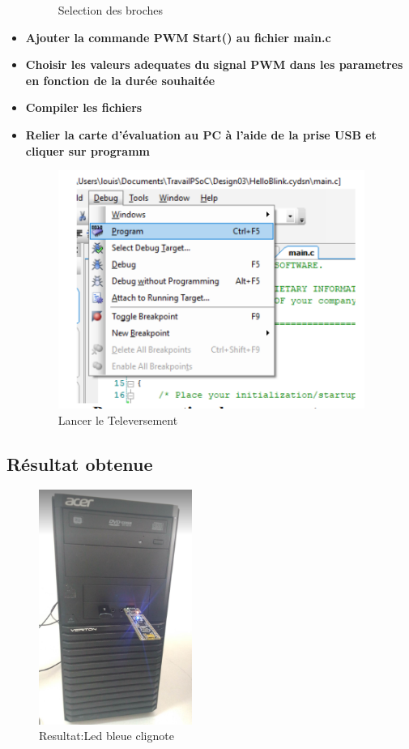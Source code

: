 \begin{itemize}
\begin{figure}[htp]
        \caption{Selection des broches }
        \label{fig:example3}
    \end{figure}
    \item \textbf{Ajouter la commande  PWM Start() au fichier main.c}
    \item \textbf{Choisir les valeurs adequates du signal PWM dans les parametres en fonction de la durée souhaitée}
    \item \textbf{Compiler les fichiers }
    \item \textbf{Relier la carte d’évaluation au PC à l’aide de la prise USB et cliquer sur programm}
\\
\begin{figure}[htp]
    \centering
    \includegraphics[width=10cm]{images/click.png }
    \caption{Lancer le Televersement }
    \label{fig:example4}
  \end{figure}
\end{itemize}
\subsection{Résultat obtenue}
\label{sec:Résultat obtenue}

\begin{figure}[htp]
    \centering
    \includegraphics[width=5cm]{images/led.png }
    \caption{ Resultat:Led bleue clignote }
    \label{fig:example5}
  \end{figure}

